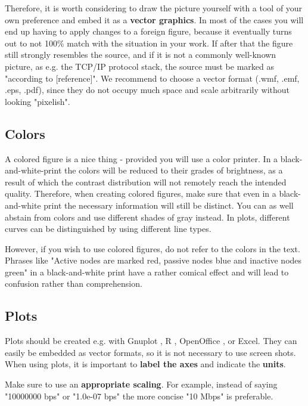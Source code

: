 Therefore, it is worth considering to draw the picture yourself with a tool
of your own preference and embed it as a \textbf{vector graphics}.  
In most of the cases you will end up having to apply changes to a foreign figure,
because it eventually turns out to not 100\% match with the situation in your work.
If after that the figure still strongly resembles the source, and if it is not a
commonly well-known picture, as e.g. the TCP/IP protocol stack, the source must
be marked as "according to [reference]". We recommend to choose
a vector format (.wmf, .emf, .eps, .pdf), since they do not occupy much space
and scale arbitrarily without looking "pixelish".


\subsection*{Colors}

A colored figure is a nice thing - provided you will use a color printer. In a
black-and-white-print the colors will be reduced to their grades of brightness, as
a result of which the contrast distribution will not remotely reach the intended
quality. Therefore, when creating colored figures, make sure that even in a black-and-white
print the necessary information will still be distinct. You can as well abstain
from colors and use different shades of gray instead. In plots, different curves can
be distinguished by using different line types.

However, if you wish to use colored figures, do not refer to the colors in the text.
Phrases like "Active nodes are marked red, passive nodes blue and inactive nodes green"
in a black-and-white print have a rather comical effect and will lead to confusion rather 
than comprehension.


\subsection*{Plots}

Plots should be created e.g. with Gnuplot \cite{gnuplot_homepage}, R \cite{r_homepage},
OpenOffice \cite{oo_homepage}, or Excel. They can easily be embedded as vector formats,
so it is not necessary to use screen shots. When using plots, it is important to \textbf{label the
axes} and indicate the \textbf{units}.

Make sure to use an \textbf{appropriate scaling}. For example, instead of saying "10000000 bps"
or "1.0e-07 bps" the more concise "10 Mbps" is preferable.


